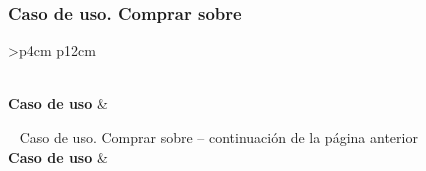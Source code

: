 
\subsubsection{Caso de uso. Comprar sobre} \label{sec:cu_comprar-sobre}
\begin{longtable}{
    >{}p{4cm}
    p{12cm}
    }
    \caption{Caso de uso. Comprar sobre} \label{table:cu_comprar-sobre} \\
    \toprule
    \textbf{Caso de uso} &  \\
    \endfirsthead
    
    {{ \tablename\ \thetable{} Caso de uso. Comprar sobre -- continuación de la página anterior}} \\
    \toprule
    \textbf{Caso de uso} &  \\
    \midrule
    \endhead
    
    \midrule
     \\ 
    \endfoot
    
    \bottomrule
    \endlastfoot
    

\end{longtable}
